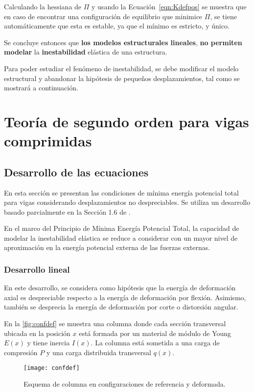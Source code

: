 Calculando la hessiana de $\Pi$ y usando la Ecuación~\ref{eqn:Kdefpos} se muestra que en caso de encontrar una configuración de equilibrio que minimice $\Pi$, se tiene automáticamente que esta es estable, ya que el mínimo es estricto, y único.  

Se concluye entonces que \textbf{los modelos estructurales lineales}, \textbf{no permiten modelar} la \textbf{inestabilidad} elástica de una estructura. %

Para poder estudiar el fenómeno de inestabilidad, se debe modificar el modelo estructural y abandonar la hipótesis de pequeños desplazamientos, tal como se mostrará a continuación.
 




\section{Teoría de segundo orden para vigas comprimidas}

\subsection{Desarrollo de las ecuaciones}

En esta sección se presentan las condiciones de mínima energía potencial total para vigas considerando desplazamientos no despreciables. Se utiliza un desarrollo basado parcialmente en la Sección 1.6 de \citep{yoo2011}.

En el marco del Principio de Mínima Energía Potencial Total, la capacidad de modelar la inestabilidad elástica se reduce a considerar con un mayor nivel de aproximación en la energía potencial externa de las fuerzas externas.
%

\subsubsection{Desarrollo lineal}

En este desarrollo, se considera como hipótesis que la energía de deformación axial es despreciable respecto a la energía de deformación por flexión. %
Asimismo, también se desprecia la energía de deformación por corte o distorsión angular.

En la \autoref{fig:confdef} se muestra una columna donde cada sección transversal ubicada en la posición $x$ está formada por un material de módulo de Young $E(x)$ y tiene inercia $I(x)$. La columna está sometida a una carga de compresión $P$ y una carga distribuida transversal $q(x)$.
%
\begin{figure}[htb]
	\centering
	\texttt{[image: confdef]}
	\caption{Esquema de columna en configuraciones de referencia y deformada.}
	\label{fig:confdef}
\end{figure}


